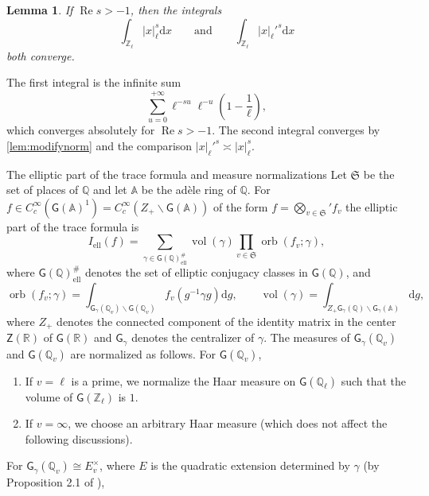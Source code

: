 \documentclass[10pt,oneside,reqno]{amsart}
\makeatletter
\newcommand\rmd{\mathrm{d}}
\renewcommand\AA{\mathbb{A}}
\newcommand\QQ{\mathbb{Q}}
\newcommand\RR{\mathbb{R}}
\newcommand\ZZ{\mathbb{Z}}
\newcommand\mf[1]{\mathfrak{#1}}
\newcommand\G{\mathsf{G}}
\newcommand\Z{\mathsf{Z}}
\newcommand\bs{\backslash}
\renewcommand\Re{\mathop{\mathrm{Re}}}
\newcommand\el{\mathrm{ell}}
\DeclareMathOperator\vol{vol}
\DeclareMathOperator\orb{orb}
\def\subsection{\@startsection{subsection}{2}
  \z@{3pt\@plus0pt}{-.5em}%
  {\normalfont\bfseries}}
\theoremstyle{THEOREM}
\newtheorem{lemma}[theorem]{Lemma}
\theoremstyle{DEFINITION}
\theoremstyle{EXERCISE}
\numberwithin{equation}{section}
\renewenvironment{proof}[1][\proofname]{\par
  \vspace{-6pt}
  \pushQED{\qed}
  \normalfont \topsep6\p@\@plus6\p@\relax
  \trivlist
  \item[\hskip\labelsep\rmfamily\bfseries
    #1\@addpunct{:}]\ignorespaces
}{
  \popQED\endtrivlist\@endpefalse
  \vspace{-6pt}
}
\makeatother
\begin{document}
\begin{lemma}\label{lem:ladiconverge}
If $\Re s>-1$, then the integrals
\[
\int_{\ZZ_\ell} |x|_\ell^{s}\rmd x  \qquad\text{and}\qquad \int_{\ZZ_\ell} |x|_\ell'^{s}\rmd x 
\]
both converge.
\end{lemma}
\begin{proof}
The first integral is the infinite sum
\[
\sum_{u=0}^{+\infty}\ell^{-su}\ell^{-u}\left(1-\frac1\ell\right),
\]
which converges absolutely for $\Re s>-1$. The second integral converges by \autoref{lem:modifynorm} and the comparison $|x|_\ell'^{s} \asymp|x|_\ell^{s}$.
\end{proof}

\subsection{The elliptic part of the trace formula and measure normalizations}
Let $\mf{S}$ be the set of places of $\QQ$ and let $\AA$ be the ad\`ele ring of $\QQ$. For $f\in C_c^\infty(\G(\AA)^1)=C_c^\infty(Z_+\bs \G(\AA))$ of the form $f=\bigotimes_{v\in \mf{S}}' f_v$ the elliptic part of the trace formula is
\begin{equation}\label{eq:elliptictrace}
I_\el(f)=\sum_{\gamma\in \G(\QQ)^\#_\el}\vol(\gamma)\prod_{v\in \mathfrak{S}}\orb(f_v;\gamma),
\end{equation}
where $ \G(\QQ)^\#_\el$ denotes the set of elliptic conjugacy classes in $\G(\QQ)$, and
\[
\orb(f_v;\gamma)=\int_{\G_\gamma(\QQ_v)\bs \G(\QQ_v)} f_v(g^{-1}\gamma g)\rmd g,
\qquad
\vol(\gamma)=\int_{Z_+\G_\gamma(\QQ)\bs \G_\gamma(\AA)} \rmd g,
\]
where $Z_+$ denotes the connected component of the identity matrix in the center $\Z(\RR)$ of $\G(\RR)$ and $\G_\gamma$ denotes the centralizer of $\gamma$. The measures of $\G_\gamma(\QQ_v)$ and $\G(\QQ_v)$ are normalized as follows. For $\G(\QQ_v)$, 
\begin{enumerate}[itemsep=0pt,parsep=0pt,topsep=0pt,leftmargin=0pt,labelsep=3pt,itemindent=9pt,label=\textbullet]
  \item If $v=\ell$ is a prime, we normalize the Haar measure on $\G(\QQ_\ell)$ such that the volume of $\G(\ZZ_\ell)$ is $1$.
  \item If $v=\infty$, we choose an arbitrary Haar measure (which does not affect the following discussions).
\end{enumerate} 
For $\G_\gamma(\QQ_v)\cong E_v^\times$, where $E$ is the quadratic extension determined by $\gamma$ (by Proposition 2.1 of \cite{cheng2025}),
\end{document}

